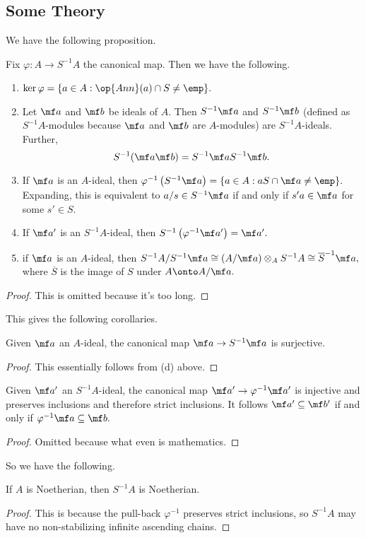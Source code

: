\subsection{Some Theory}
We have the following proposition.
\begin{proposition}
    Fix $\varphi:A\to S^{-1}A$ the canonical map. Then we have the following.
    \begin{enumerate}[label=(\alph*)]
        \item $\ker\varphi=\{a\in A:\op{Ann}(a)\cap S\ne\emp\}.$
        \item Let $\mf a$ and $\mf b$ be ideals of $A.$ Then $S^{-1}\mf a$ and $S^{-1}\mf b$ (defined as $S^{-1}A$-modules because $\mf a$ and $\mf b$ are $A$-modules) are $S^{-1}A$-ideals. Further,
        \[S^{-1}(\mf a\mf b)=S^{-1}\mf aS^{-1}\mf b.\]
        \item If $\mf a$ is an $A$-ideal, then $\varphi^{-1}\left(S^{-1}\mf a\right)=\{a\in A:aS\cap\mf a\ne\emp\}.$ Expanding, this is equivalent to $a/s\in S^{-1}\mf a$ if and only if $s'a\in\mf a$ for some $s'\in S.$
        \item If $\mf a'$ is an $S^{-1}A$-ideal, then $S^{-1}\left(\varphi^{-1}\mf a'\right)=\mf a'.$
        \item if $\mf a$ is an $A$-ideal, then $S^{-1}A/S^{-1}\mf a\cong(A/\mf a)\otimes_AS^{-1}A\cong\overline S^{-1}\mf a,$ where $\overline S$ is the image of $S$ under $A\onto A/\mf a.$
    \end{enumerate}
\end{proposition}
\begin{proof}
    This is omitted because it's too long.
\end{proof}
This gives the following corollaries.
\begin{corollary}
    Given $\mf a$ an $A$-ideal, the canonical map $\mf a\to S^{-1}\mf a$ is surjective.
\end{corollary}
\begin{proof}
    This essentially follows from (d) above.
\end{proof}
\begin{corollary}
    Given $\mf a'$ an $S^{-1}A$-ideal, the canonical map $\mf a'\to\varphi^{-1}\mf a'$ is injective and preserves inclusions and therefore strict inclusions. It follows $\mf a'\subseteq\mf b'$ if and only if $\varphi^{-1}\mf a\subseteq\mf b.$
\end{corollary}
\begin{proof}
    Omitted because what even is mathematics.
\end{proof}
So we have the following.
\begin{proposition}
    If $A$ is Noetherian, then $S^{-1}A$ is Noetherian.
\end{proposition}
\begin{proof}
    This is because the pull-back $\varphi^{-1}$ preserves strict inclusions, so $S^{-1}A$ may have no non-stabilizing infinite ascending chains.
\end{proof}


